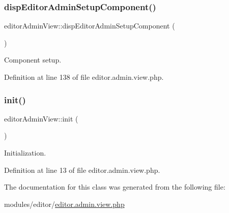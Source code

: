 \subsubsection{\texorpdfstring{disp\+Editor\+Admin\+Setup\+Component()}{dispEditorAdminSetupComponent()}}
{\footnotesize\ttfamily editor\+Admin\+View\+::disp\+Editor\+Admin\+Setup\+Component (\begin{DoxyParamCaption}{ }\end{DoxyParamCaption})}



Component setup. 



Definition at line 138 of file editor.\+admin.\+view.\+php.

\mbox{\label{classeditorAdminView_a18af5d75c5a6fda358ddd301f99ef609}} 
\subsubsection{\texorpdfstring{init()}{init()}}
{\footnotesize\ttfamily editor\+Admin\+View\+::init (\begin{DoxyParamCaption}{ }\end{DoxyParamCaption})}



Initialization. 



Definition at line 13 of file editor.\+admin.\+view.\+php.



The documentation for this class was generated from the following file\+:\begin{DoxyCompactItemize}
\item 
modules/editor/\hyperlink{editor_8admin_8view_8php}{editor.\+admin.\+view.\+php}\end{DoxyCompactItemize}
